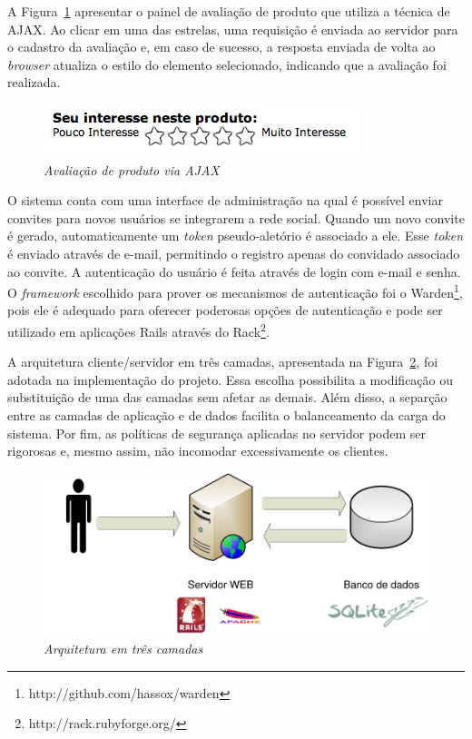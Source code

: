 A Figura~\ref{fig:rater-ajax} apresentar o painel de avaliação de produto que utiliza a técnica de AJAX. Ao clicar em uma das estrelas, uma requisição é enviada ao servidor para o cadastro da avaliação e, em caso de sucesso, a resposta enviada de volta ao \emph{browser} atualiza o estilo do elemento selecionado, indicando que a avaliação foi realizada.
\begin{figure}
 \centering
 \includegraphics{imagens/rater-ajax}
 \caption{\it Avaliação de produto via AJAX}
 \label{fig:rater-ajax}
\end{figure}

O sistema conta com uma interface de administração na qual é possível enviar convites para novos usuários se integrarem a rede social. Quando um novo convite é gerado, automaticamente um \emph{token} pseudo-aletório é associado a ele. Esse \emph{token} é enviado através de e-mail, permitindo o registro apenas do convidado associado ao convite. A autenticação do usuário é feita através de login com e-mail e senha. O \emph{framework} escolhido para prover os mecanismos de autenticação foi o Warden\footnote{http://github.com/hassox/warden}, pois ele é adequado para oferecer poderosas opções de autenticação e pode ser utilizado em aplicações Rails através do Rack\footnote{http://rack.rubyforge.org/}.

A arquitetura cliente/servidor em três camadas, apresentada na Figura~\ref{fig:three_tier}, foi adotada na implementação do projeto. Essa escolha possibilita a modificação ou substituição de uma das camadas sem afetar as demais. Além disso, a separção entre as camadas de aplicação e de dados facilita o balanceamento da carga do sistema. Por fim, as políticas de segurança aplicadas no servidor podem ser rigorosas e, mesmo assim, não incomodar excessivamente os clientes.

\begin{figure}
 \centering
 \includegraphics[width=\textwidth]{imagens/Implementacao_Detalhe}
 \caption{\it Arquitetura em três camadas}
 \label{fig:three_tier}
\end{figure}


